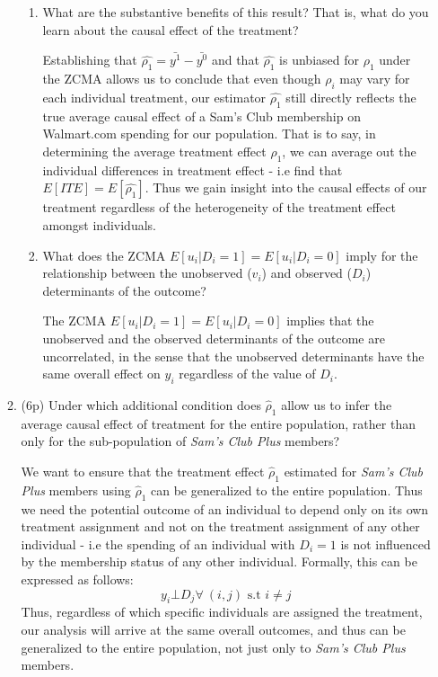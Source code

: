 \documentclass{article}
\newcommand{\gap}{\vspace{1 em}}
\begin{document}
\begin{enumerate}[label=\textbf{Q\arabic{enumi}}.,ref=Q\arabic{enumi}, wide=0pt, itemsep=1em, topsep=5pt]
\begin{enumerate}
        \begin{enumerate}
        \item What are the substantive benefits of this result? That is, what do you learn about the causal effect of the treatment?
        \begin{solution}
        {   
            Establishing that $\widehat{\rho_1} = \bar{y^1} - \bar{y^0}$ and that $\widehat{\rho_1 }$ is unbiased for $\rho_1$ under the ZCMA allows us to conclude that even though $\rho_i$ may vary for each individual treatment, our estimator $\widehat{\rho_1 }$ still directly reflects the true average causal effect of a Sam's Club membership on Walmart.com spending for our population. That is to say, in determining the average treatment effect $\rho_1$, we can average out the individual differences in treatment effect - i.e find that $E[ITE] = E[\widehat{\rho_1}]$. Thus we gain insight into the causal effects of our treatment regardless of the heterogeneity of the treatment effect amongst individuals.
        }
        \end{solution}
        \gap
        \item What does the ZCMA $E[u_i|D_i=1]=E[u_i|D_i=0]$ imply for the relationship between the unobserved ($v_i$) and observed ($D_i$) determinants of the outcome?
        \begin{solution}
            {
                The ZCMA $E[u_i|D_i=1]=E[u_i|D_i=0]$ implies that the unobserved and the observed determinants of the outcome are uncorrelated, in the sense that the unobserved determinants have the same overall effect on $y_i$ regardless of the value of $D_i$.
            }
        \end{solution}
        \gap
        \end{enumerate}

\item (6p) Under which additional condition does $\widehat{\rho}_1$ allow us to infer the average causal effect of treatment for the entire population, rather than only for the sub-population of \textit{Sam's Club Plus} members?
    \begin{solution}
    {
        We want to ensure that the treatment effect $\widehat{\rho}_1$ estimated for \textit{Sam's Club Plus} members using $\widehat{\rho}_1$ can be generalized to the entire population. Thus we need the potential outcome of an individual to depend only on its own treatment assignment and not on the treatment assignment of any other individual - i.e the spending of an individual with $D_i=1$ is not influenced by the membership status of any other individual. Formally, this can be expressed as follows:
        \[y_i \bot D_j \forall \ (i, j) \text{ s.t } i \neq j\]
        Thus, regardless of which specific individuals are assigned the treatment, our analysis will arrive at the same overall outcomes, and thus can be generalized to the entire population, not just only to \textit{Sam's Club Plus} members.
        \gap
    }
    \end{solution}
    \end{enumerate}


\end{enumerate}
\end{document}
